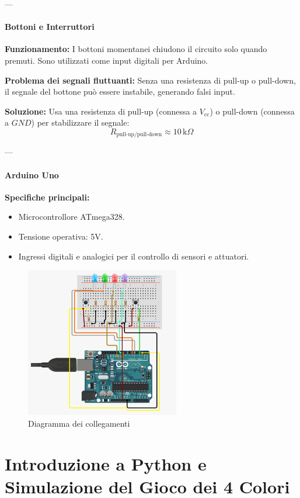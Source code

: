 \documentclass[a4paper,12pt]{report}
\begin{document}
---

\subsubsection{Bottoni e Interruttori}
\textbf{Funzionamento:} I bottoni momentanei chiudono il circuito solo quando premuti. Sono utilizzati come input digitali per Arduino.

\textbf{Problema dei segnali fluttuanti:} Senza una resistenza di pull-up o pull-down, il segnale del bottone può essere instabile, generando falsi input.

\textbf{Soluzione:} Usa una resistenza di pull-up (connessa a \(V_{\text{cc}}\)) o pull-down (connessa a \(GND\)) per stabilizzare il segnale:
\[
R_{\text{pull-up/pull-down}} \approx 10 \, \text{k}\Omega
\]

---

\subsubsection{Arduino Uno}
\textbf{Specifiche principali:}
\begin{itemize}
    \item Microcontrollore ATmega328.
    \item Tensione operativa: 5V.
    \item Ingressi digitali e analogici per il controllo di sensori e attuatori.
\end{itemize}

\begin{figure}[H]
    \centering
    \includegraphics[width=0.6\textwidth]{arduino.png}
    \caption{Diagramma dei collegamenti}
    \label{fig:full_adder}
\end{figure}

\chapter{Introduzione a Python e Simulazione del Gioco dei 4 Colori}
\end{document}
